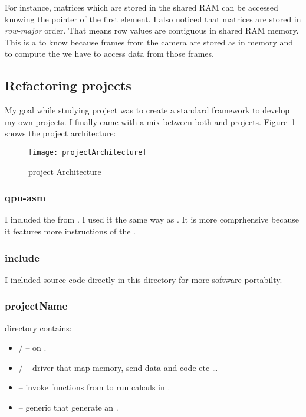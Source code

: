 For instance, matrices which are stored in the shared RAM can be accessed knowing the pointer of the first element. I also noticed that matrices are stored in \emph{row-major} order. That means row values are contiguous in shared RAM memory. This is a  to know because frames from the \rasp{} camera are stored as  in memory and to compute the  we have to access data from those frames.


\subsection{Refactoring projects}

My goal while studying  project was to create a standard framework to develop my own projects. I finally came with a mix between both  and  projects. Figure~\ref{projectArchitectureFigure} shows the project architecture:

\begin{figure}[!htbp]
	\centering
	\texttt{[image: projectArchitecture]}
	\caption{project Architecture}
	\label{projectArchitectureFigure}
\end{figure}
\FloatBarrier

\subsubsection{qpu-asm}

I included the   from . I used it the same way as . It is more comprhensive because it features more instructions of the \vc.

\subsubsection{include}

I included  source code directly in this directory for more software portabilty.

\subsubsection{projectName}

 directory contains:
\begin{itemize}
	\item {}/ --  on \vc.
	\item {}/ --  driver that map memory, send data and code etc \ldots
	\item {} -- invoke functions from  to run calculs in \vc.
	\item {} -- generic  that generate an .
\end{itemize}

